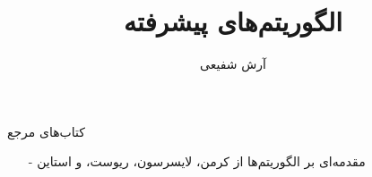 \documentclass[aspectratio=169]{beamer}
\title{الگوریتم‌های پیشرفته}
\author{آرش شفیعی}
\institute{\texttt{[image: logos/ui.png]}}
\date{}
\begin{document}
\begin{frame}[plain]
	\maketitle
\end{frame}

\setcounter{framenumber}{0}
\raggedleft

\begin{frame}{کتاب‌های مرجع}
	\begin{itemize}\itmsep{5mm}
	\item[-]
مقدمه‌ای بر الگوریتم‌ها از کرمن، لایسرسون، ریوست، و استاین
	\end{itemize}
\end{frame}


\end{document}

